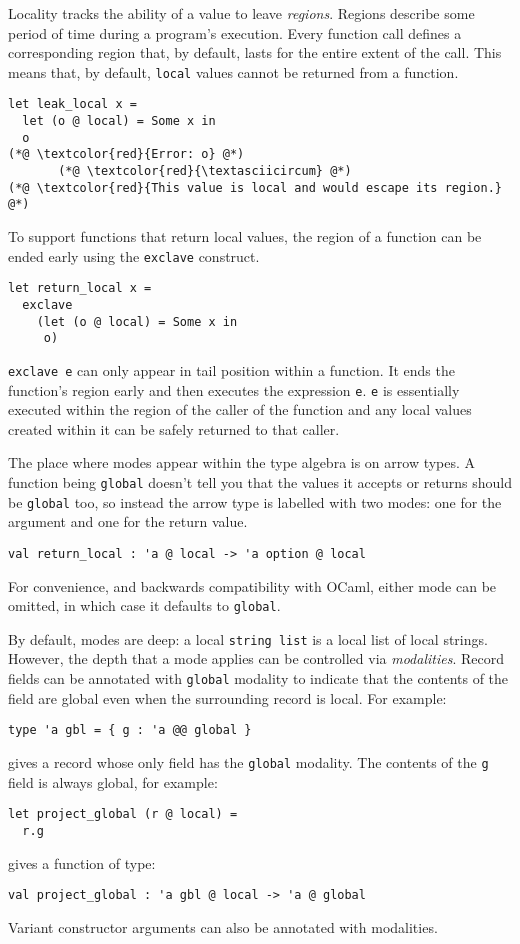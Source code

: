 \documentclass[acmsmall, screen, nonacm]{acmart}
\theoremstyle{definition}
\begin{document}
Locality tracks the ability of a value to leave \emph{regions}.  Regions
describe some period of time during a program's execution. Every
function call defines a corresponding region that, by default, lasts for
the entire extent of the call. This means that, by default,
\lstinline[style=ocaml]{local} values cannot be returned from a
function.
\begin{lstlisting}[style=ocaml]
let leak_local x =
  let (o @ local) = Some x in
  o
(*@ \textcolor{red}{Error: o} @*)
       (*@ \textcolor{red}{\textasciicircum} @*)
(*@ \textcolor{red}{This value is local and would escape its region.} @*)
\end{lstlisting}

To support functions that return local values, the region of a function
can be ended early using the \lstinline[style=ocaml]{exclave} construct.
\begin{lstlisting}[style=ocaml]
let return_local x =
  exclave
    (let (o @ local) = Some x in
     o)
\end{lstlisting}
\lstinline[style=ocaml]{exclave e} can only appear in tail position
within a function.  It ends the function's region early and then
executes the expression
\lstinline[style=ocaml]{e}. \lstinline[style=ocaml]{e} is essentially
executed within the region of the caller of the function and any local
values created within it can be safely returned to that caller.

The place where modes appear within the type algebra is on arrow
types. A function being \lstinline[style=ocaml]{global} doesn't tell you
that the values it accepts or returns should be
\lstinline[style=ocaml]{global} too, so instead the arrow type is
labelled with two modes: one for the argument and one for the return
value.
\begin{lstlisting}[style=ocaml]
val return_local : 'a @ local -> 'a option @ local
\end{lstlisting}
For convenience, and backwards compatibility with OCaml, either mode can
be omitted, in which case it defaults to
\lstinline[style=ocaml]{global}.

By default, modes are deep: a local \lstinline[style=ocaml]{string list}
is a local list of local strings. However, the depth that a mode applies
can be controlled via \emph{modalities}. Record fields can be annotated
with \lstinline[style=ocaml]{global} modality to indicate that the
contents of the field are global even when the surrounding record is
local. For example:
\begin{lstlisting}[style=ocaml]
type 'a gbl = { g : 'a @@ global }
\end{lstlisting}
gives a record whose only field has the \lstinline[style=ocaml]{global}
modality. The contents of the \lstinline[style=ocaml]{g} field is always
global, for example:
\begin{lstlisting}[style=ocaml]
let project_global (r @ local) =
  r.g
\end{lstlisting}
gives a function of type:
\begin{lstlisting}[style=ocaml]
val project_global : 'a gbl @ local -> 'a @ global
\end{lstlisting}
Variant constructor arguments can also be annotated with modalities.
\end{document}
